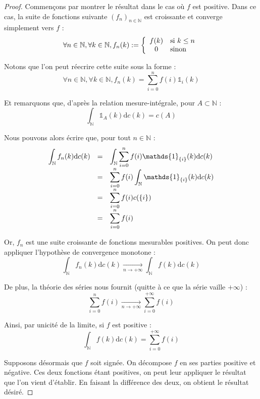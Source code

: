 \documentclass[../integ-proba.tex]{subfiles}
\begin{document}
    \begin{proof}
        Commençons par montrer le résultat dans le cas où $f$ est positive.
        Dans ce cas, la suite de fonctions suivante $\left(f_n\right)_{n\in\mathbb{N}}$ est croissante et converge simplement vers $f$ :
        $$
        \forall n \in \mathbb{N}, \forall k \in \mathbb{N}, f_n(k) :=
        \left\{
            \begin{array}{cl}
                f(k) & \textnormal{si } k \leq n\\
                0    & \textnormal{sinon}
            \end{array}
        \right.
        $$

        Notons que l'on peut réecrire cette suite sous la forme :
        $$
        \forall n \in \mathbb{N}, \forall k \in \mathbb{N}, f_n(k) = \sum_{i=0}^n f(i) \mathds{1}_{i}(k)
        $$

        Et remarquons que, d'après la relation mesure-intégrale, pour $A \subset \mathbb{N}$ :
        $$
        \int_\mathbb{N} \mathds{1}_{A}(k) \text{d} c(k) = c(A)
        $$

        Nous pouvons alors écrire que, pour tout $n \in \mathbb{N}$ :
        $$
        {
        \everymath={\displaystyle}
        \begin{array}{rcl}
            \int_\mathbb{N} f_n(k)\text{d}c(k) & = & \int_\mathbb{N} \sum_{i=0}^n f(i) \mathds{1}_{\{i\}}(k) \text{d}c(k)\\
                                               & = & \sum_{i=0}^n f(i) \int_\mathbb{N} \mathds{1}_{\{i\}}(k) \text{d}c(k)\\
                                               & = & \sum_{i=0}^n f(i) c(\{i\})\\
                                               & = & \sum_{i=0}^n f(i)
        \end{array}
        }
        $$

        Or, $f_n$ est une suite croissante de fonctions mesurables positives. On peut donc appliquer l'hypothèse de convergence monotone :
        $$
        \int_\mathbb{N} f_n(k)\text{d}c(k) \xrightarrow[n \to + \infty]{} \int_\mathbb{N} f(k)\text{d}c(k)
        $$

        De plus, la théorie des séries nous fournit (quitte à ce que la série vaille $+\infty$) :
        $$
        \sum_{i=0}^n f(i) \xrightarrow[n \to + \infty]{} \sum_{i=0}^{+\infty} f(i)
        $$

        Ainsi, par unicité de la limite, si $f$ est positive :
        $$
        \int_\mathbb{N} f(k)\text{d}c(k) = \sum_{i=0}^{+\infty} f(i)
        $$

        Supposons désormais que $f$ soit signée. On décompose $f$ en ses parties positive et négative.
        Ces deux fonctions étant positives, on peut leur appliquer le résultat que l'on vient d'établir.
        En faisant la différence des deux, on obtient le résultat désiré.
    \end{proof}
\end{document}
